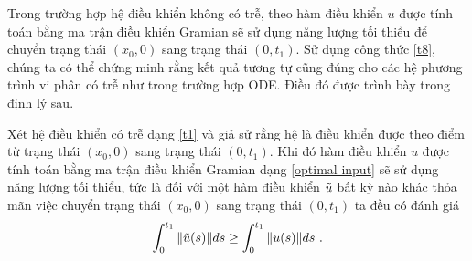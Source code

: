 Trong trường hợp hệ điều khiển không có trễ, theo \cite{Del72} hàm điều khiển $u$ được tính toán bằng ma trận điều khiển Gramian sẽ sử dụng năng lượng tối thiểu để chuyển trạng thái $(x_0,0)$ sang trạng thái $(0,t_1)$. Sử dụng công thức \eqref{t8}, chúng ta có thể chứng minh rằng kết quả tương tự cũng đúng cho các hệ phương trình vi phân có trễ như trong trường hợp ODE. Điều đó được trình bày trong định lý sau.

\begin{dly}
Xét hệ điều khiển có trễ dạng \eqref{t1} và giả sử rằng hệ là điều khiển được theo điểm từ trạng thái $(x_0,0)$ sang trạng thái $(0,t_1)$. 
Khi đó hàm điều khiển $u$ được tính toán bằng ma trận điều khiển Gramian dạng \eqref{optimal input} sẽ sử dụng năng lượng tối thiểu, tức là 
đối với một hàm điều khiển $\tilde{u}$ bất kỳ nào khác thỏa mãn việc chuyển trạng thái $(x_0,0)$ sang trạng thái $(0,t_1)$ ta đều có đánh giá
%
\begin{equation}\label{optimal energy}
\int_{0}^{t_1} \| \tu(s) \| ds \geq \int_{0}^{t_1} \| u(s) \| ds \ .
\end{equation}
%
\end{dly}
